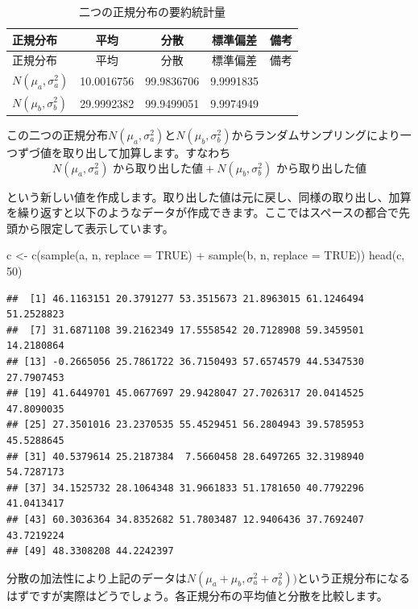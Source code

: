\documentclass[]{tufte-handout}
\newenvironment{Shaded}{}{}
\newcommand{\AttributeTok}[1]{\textcolor[rgb]{0.49,0.56,0.16}{#1}}
\newcommand{\ConstantTok}[1]{\textcolor[rgb]{0.53,0.00,0.00}{#1}}
\newcommand{\DecValTok}[1]{\textcolor[rgb]{0.25,0.63,0.44}{#1}}
\newcommand{\FunctionTok}[1]{\textcolor[rgb]{0.02,0.16,0.49}{#1}}
\newcommand{\NormalTok}[1]{#1}
\newcommand{\OtherTok}[1]{\textcolor[rgb]{0.00,0.44,0.13}{#1}}
\newcommand{\SpecialCharTok}[1]{\textcolor[rgb]{0.25,0.44,0.63}{#1}}
\begin{document}
\begin{longtable}[]{@{}lcccl@{}}
\caption{二つの正規分布の要約統計量}\tabularnewline
\toprule
正規分布 & 平均 & 分散 & 標準偏差 & 備考 \\
\midrule
\endfirsthead
\toprule
正規分布 & 平均 & 分散 & 標準偏差 & 備考 \\
\midrule
\endhead
\(N(\mu_a, \sigma^2_a)\) & 10.0016756 & 99.9836706 & 9.9991835 & \\
\(N(\mu_b, \sigma^2_b)\) & 29.9992382 & 99.9499051 & 9.9974949 & \\
\bottomrule
\end{longtable}

この二つの正規分布\(N(\mu_a, \sigma^2_a)\)と\(N(\mu_b,\sigma^2_b)\)からランダムサンプリングにより一つずづ値を取り出して加算します。すなわち
　
\[N(\mu_a, \sigma^2_a)\mbox{ から取り出した値} + N(\mu_b,\sigma^2_b)\mbox{ から取り出した値}\]

という新しい値を作成します。取り出した値は元に戻し、同様の取り出し、加算を繰り返すと以下のようなデータが作成できます。ここではスペースの都合で先頭から限定して表示しています。

\begin{Shaded}
\begin{Highlighting}[numbers=left,,]
\NormalTok{c }\OtherTok{\textless{}{-}} \FunctionTok{c}\NormalTok{(}\FunctionTok{sample}\NormalTok{(a, n, }\AttributeTok{replace =} \ConstantTok{TRUE}\NormalTok{) }\SpecialCharTok{+} \FunctionTok{sample}\NormalTok{(b, n, }\AttributeTok{replace =} \ConstantTok{TRUE}\NormalTok{))}
\FunctionTok{head}\NormalTok{(c, }\DecValTok{50}\NormalTok{)}
\end{Highlighting}
\end{Shaded}

\begin{verbatim}
##  [1] 46.1163151 20.3791277 53.3515673 21.8963015 61.1246494 51.2528823
##  [7] 31.6871108 39.2162349 17.5558542 20.7128908 59.3459501 14.2180864
## [13] -0.2665056 25.7861722 36.7150493 57.6574579 44.5347530 27.7907453
## [19] 41.6449701 45.0677697 29.9428047 27.7026317 20.0414525 47.8090035
## [25] 27.3501016 23.2370535 55.4529451 56.2804943 39.5785953 45.5288645
## [31] 40.5379614 25.2187384  7.5660458 28.6497265 32.3198940 54.7287173
## [37] 34.1525732 28.1064348 31.9661833 51.1781650 40.7792296 41.0413417
## [43] 60.3036364 34.8352682 51.7803487 12.9406436 37.7692407 43.7219224
## [49] 48.3308208 44.2242397
\end{verbatim}

分散の加法性により上記のデータは\(N(\mu_a + \mu_b, \sigma^2_a + \sigma^2_b))\)という正規分布になるはずですが実際はどうでしょう。各正規分布の平均値と分散を比較します。
\end{document}
